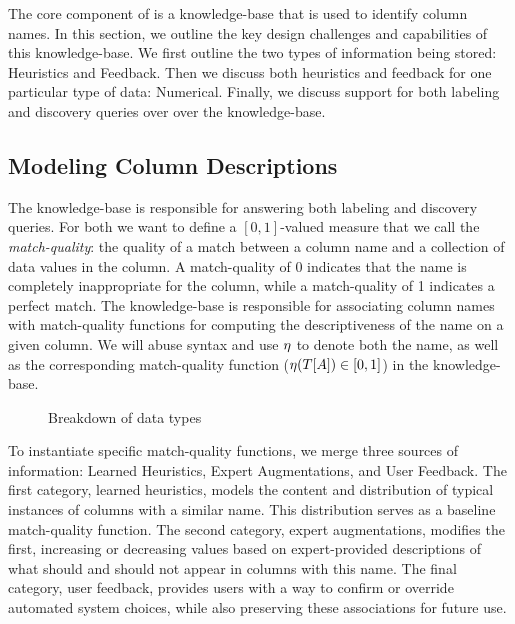 
The core component of \systemname is a knowledge-base that is used to identify column names.
In this section, we outline the key design challenges and capabilities of this knowledge-base.  
We first outline the two types of information being stored: Heuristics and Feedback.
Then we discuss both heuristics and feedback for one particular type of data: Numerical.  
Finally, we discuss support for both labeling and discovery queries over over the knowledge-base.

\subsection{Modeling Column Descriptions}

The \systemname knowledge-base is responsible for answering both labeling and discovery queries.
For both we want to define a $[0,1]$-valued measure that we call the \emph{match-quality}: the quality of a match between a column name and a collection of data values in the column.
A match-quality of 0 indicates that the name is completely inappropriate for the column, while a match-quality of 1 indicates a perfect match.  
The \systemname knowledge-base is responsible for associating column names with match-quality functions for computing the descriptiveness of the name on a given column.
We will abuse syntax and use $\eta$ to denote both the name, as well as the corresponding match-quality function ($\eta(T[A]) \in [0,1]$) in the knowledge-base.

\begin{figure}
\caption{Breakdown of data types}
\label{fig:type-breakdown}
\end{figure}

To instantiate specific match-quality functions, we merge three sources of information: Learned Heuristics, Expert Augmentations, and User Feedback. 
The first category, learned heuristics, models the content and distribution of typical instances of columns with a similar name.
This distribution serves as a baseline match-quality function.
The second category, expert augmentations, modifies the first, increasing or decreasing values based on expert-provided descriptions of what should and should not appear in columns with this name.
The final category, user feedback, provides users with a way to confirm or override automated system choices, while also preserving these associations for future use.

